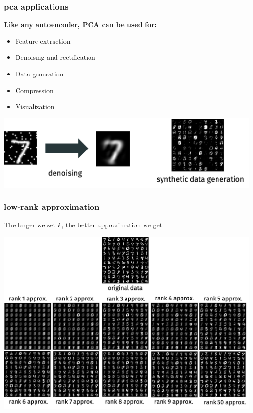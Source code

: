 \documentclass[handout,compress]{beamer}
\begin{document}
\begin{frame}
	\frametitle{pca applications}
	\textbf{Like any autoencoder, PCA can be used for:}
	\begin{itemize}
		\item Feature extraction
		\item Denoising and rectification
		\item Data generation
		\item Compression
		\item Visualization
	\end{itemize}
\begin{center}
	\includegraphics[width=.8\textwidth]{pca_applications.png}
\end{center}
\end{frame}

\begin{frame}[t]
	\frametitle{low-rank approximation}

\begin{center}
	\vspace{-.5em}
	The larger we set $k$, the better approximation we get.
	
	\includegraphics[width=.95\textwidth]{low_rank_approxs2.png}
	\end{center}
\end{frame} 
\end{document}
